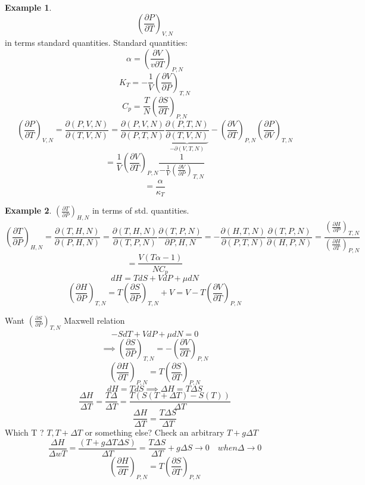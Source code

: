 \documentclass[11pt]{article}
\theoremstyle{definition}
\newtheorem{exm}{Example}[section]
\begin{document}
\begin{exm}
	\[ \left( \frac{\partial P}{\partial T} \right)_{V,N}  \] 
	in terms standard quantities.
	Standard quantities:
	\[ \alpha  = \left( \frac{\partial V}{v \partial T} \right)_{P,N} \] 
	\[ K_T = -\frac{1}{V} \left (\frac{\partial V}{\partial P} \right)_{T,N}\] 
\[ C_p = \frac{T}{N} \left (\frac{\partial S}{\partial T} \right )_{P,N} \] 
\[ \left( \frac{\partial P}{\partial T} \right)_{V,N} = \frac{\partial (P,V,N)}{\partial (T,V,N)} = 
\frac{\partial (P,V,N)}{\partial (P,T,N)} \frac{\partial (P,T,N)}{ \underbrace{\partial (T,V,N)}_{-\partial(V,T,N)} } 
- \left( \frac{\partial V}{\partial T} \right)_{P,N} \left( \frac{\partial P}{\partial V} \right)_{T,N}  \] 
\[ = \frac{1}{V} \left( \frac{\partial V}{\partial T} \right)_{P,N} \frac{1}{-\frac{1}{V}\left( \frac{\partial V}{\partial P} \right)_{T,N} }  \] 
\[ = \frac{\alpha}{\kappa_T} \] 
\end{exm}

\begin{exm}
	$ \left( \frac{\partial T}{\partial P} \right)_{H,N}  $ in terms of std. quantities.
	\[ \left( \frac{\partial T}{\partial P} \right)_{H,N} = \frac{\partial (T,H,N)}{\partial (P,H,N)} = \frac{\partial (T,H,N)}{\partial (T,P,N)} \frac{\partial (T,P,N)}{\partial P,H,N} = - \frac{\partial (H,T,N)}{\partial (P,T,N)} \frac{\partial (T,P,N)}{\partial (H,P,N)} = \frac{\left( \frac{\partial H}{\partial P} \right)_{T,N} }{\left( \frac{\partial H}{\partial T} \right)_{P,N} } \] 
	\[ = \frac{V(T \alpha -1)}{N C_p} \] 
	\[ dH = TdS +V dP + \mu dN \] 
	\[ \left( \frac{\partial H}{\partial P} \right)_{T,N} = T \left( \frac{\partial S}{\partial P} \right)_{T,N} + V  = V - T \left( \frac{\partial V}{\partial T} \right)_{P,N} \] 

Want $ \left( \frac{\partial S}{\partial P} \right)_{T,N}  $ Maxwell relation
\[ -SdT + VdP + \mu dN = 0 \] 
\[ \implies \left( \frac{\partial S}{\partial P} \right)_{T,N} =  -\left( \frac{\partial V}{\partial T} \right)_{P,N}   \] 
\[ \left( \frac{\partial H}{\partial T} \right)_{P,N} = T \left( \frac{\partial S}{\partial T} \right)_{P,N}   \] 
\[ dH = TdS \implies \Delta H = T \Delta S \] 
\[ \frac{\Delta H}{\Delta T} = \frac{T \Delta}{\Delta T} = \frac{T(S(T+\Delta T) - S(T))}{\Delta T} \] 
\[ \frac{\Delta H}{\Delta T} = \frac{T \Delta S}{\Delta T} \] 
Which T ? $ T, T + \Delta T $  or something else?
Check an arbitrary $ T + g \Delta T $ 
\[ \frac{\Delta H}{\Delta wT} = \frac{(T+g \Delta T \Delta S)}{\Delta T} = \frac{T \Delta S}{\Delta T}+ g \Delta S \to 0 \quad when \Delta \to 0  \] 
\[ \left( \frac{\partial H}{\partial T} \right)_{P,N} = T \left (\frac{\partial S}{\partial T} \right )_{P,N}  \] 
\end{exm}
\end{document}

